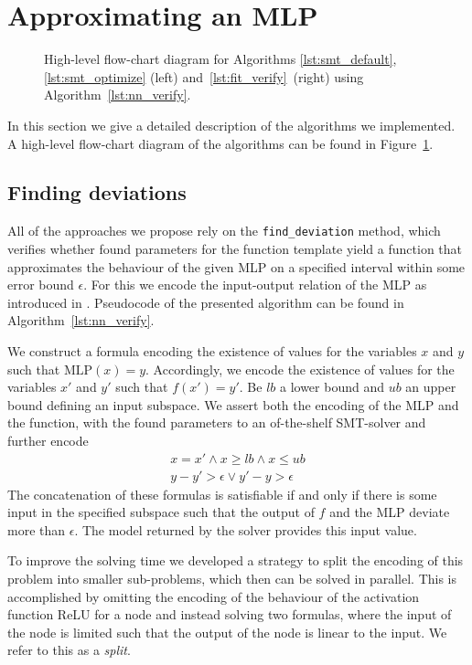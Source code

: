 \section{Approximating an MLP}
\label{sec:mlp}
\begin{figure}
    \centering
        
    \caption[]{High-level flow-chart diagram for Algorithms \ref{lst:smt_default}, \ref{lst:smt_optimize} (left) and~\ref{lst:fit_verify}~(right) using Algorithm~\ref{lst:nn_verify}.}
    \label{fig:alg}
\end{figure}
In this section we give a detailed description of the algorithms we implemented. A high-level flow-chart diagram of the algorithms can be found in Figure~\ref{fig:alg}.


\subsection{Finding deviations}
    \label{subsec:nn_verify}
    \begin{tcolorbox}[arc=0mm, colback=rwthlightgray, outer arc=0mm, colframe = white, size=small, bottom=-9mm]
        
    \end{tcolorbox}
    \vspace{9mm}
    All of the approaches we propose rely on the \lstinline{find_deviation} method, which verifies whether found parameters for the function template yield a function that approximates the behaviour of the given MLP on a specified interval within some error bound $\epsilon$. For this we encode the input-output relation of the MLP as introduced in \cite{DBLP:journals/corr/abs-2008-01204}. Pseudocode of the presented algorithm can be found in Algorithm~\ref{lst:nn_verify}.\par
    We construct a formula encoding the existence of values for the variables $x$ and $y$ such that $\text{MLP}(x)=y$. Accordingly, we encode the existence of values for the variables $x'$ and $y'$ such that $f(x')=y'$. Be $lb$ a lower bound and $ub$ an upper bound defining an input subspace. We assert both the encoding of the MLP and the function, with the found parameters to an of-the-shelf SMT-solver and further encode
    \begin{align*}
    	x = x' \land x \geq lb \land x \leq ub \\
    	y - y' > \epsilon \lor y' - y > \epsilon
    \end{align*}
    The concatenation of these formulas is satisfiable if and only if there is some input in the specified subspace such that the output of $f$ and the MLP deviate more than $\epsilon$.
    The model returned by the solver provides this input value.\par
    To improve the solving time we developed a strategy to split the encoding of this problem into smaller sub-problems, which then can be solved in parallel. This is accomplished by omitting the encoding of the behaviour of the activation function ReLU for a node and instead solving two formulas, where the input of the node is limited such that the output of the node is linear to the input. We refer to this as a \textit{split}.

